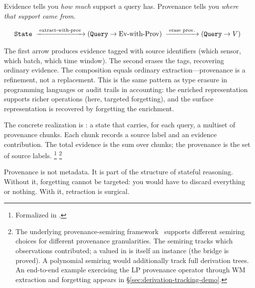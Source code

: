 \documentclass[11pt,openany]{report}
\begin{document}
Evidence tells you \emph{how much} support a query has.  Provenance
tells you \emph{where that support came from}.

\[
  \texttt{State}
  \;\xrightarrow{\;\text{extract-with-prov}\;}
  (\texttt{Query} \to \text{Ev-with-Prov})
  \;\xrightarrow{\;\text{erase prov.}\;}
  (\texttt{Query} \to V)
\]

\noindent
The first arrow produces evidence tagged with source identifiers
(which sensor, which batch, which time window).  The second erases
the tags, recovering ordinary evidence.  The composition equals
ordinary extraction---provenance is a refinement, not a replacement.
This is the same pattern as type erasure in programming languages or
audit trails in accounting: the enriched representation supports
richer operations (here, targeted forgetting), and the surface
representation is recovered by forgetting the enrichment.

The concrete realization is : a state that
carries, for each query, a multiset of provenance chunks.  Each chunk
records a source label and an evidence contribution.  The total
evidence is the sum over chunks; the provenance is the set of source
labels.%
\footnote{Formalized in
.}%
\footnote{The underlying provenance-semiring
framework~\cite{GreenKarvounarakisTannen2007} supports different
semiring choices for different provenance granularities.  The
 semiring tracks which observations contributed; a
 valued in  is itself an
 instance (the bridge is proved).  A
polynomial semiring would additionally track full derivation trees.
An end-to-end example exercising the LP provenance operator
 through WM extraction and forgetting
appears in \S\ref{sec:derivation-tracking-demo}.}

Provenance is not metadata.  It is part of the structure of stateful
reasoning.  Without it, forgetting cannot be targeted: you would have
to discard everything or nothing.  With it, retraction is surgical.

\end{document}
